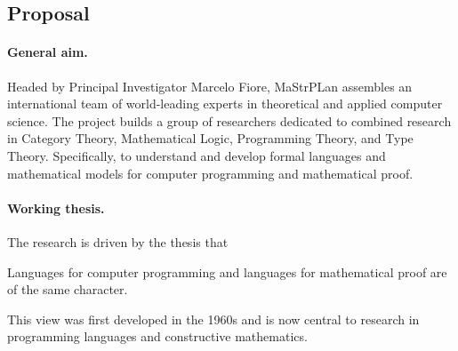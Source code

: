 \documentclass[11pt,twocolumn]{article}
\newenvironment{myquote}
  {\begin{list}{}
  {\setlength{\topsep}{2pt}
   \setlength{\partopsep}{2pt}
   \setlength{\itemsep}{2.5pt}
   \setlength{\parsep}{2.5pt}
   \setlength{\rightmargin}{1em}
   \setlength{\leftmargin}{1em}
   \setlength{\labelwidth}{.5em}}}
  {\end{list}}
\newcommand{\erc}{{\small\sf MaStrPLan}}
\newcommand{\eg}{\emph{eg.}}
\begin{document}
\clearpage
{}

\subsection{Proposal}

\paragraph*{General aim.}

Headed by Principal Investigator Marcelo Fiore, {\erc} assembles an
international team of world-leading experts in theoretical and applied
computer science.  The project builds a group of researchers
dedicated to combined research in Category Theory, Mathematical Logic,
Programming Theory, and Type Theory.  Specifically, to understand and develop
formal languages and mathematical models for computer programming and
mathematical proof. 

\paragraph*{Working thesis.}

The research is driven by the thesis that
\begin{myquote}
\item
Languages 
for computer programming
and languages 
for mathematical proof 
are of the same character.
\end{myquote}
This view %
was first developed in the 1960s %
and is now central to research in programming languages and constructive
mathematics.
\end{document}
